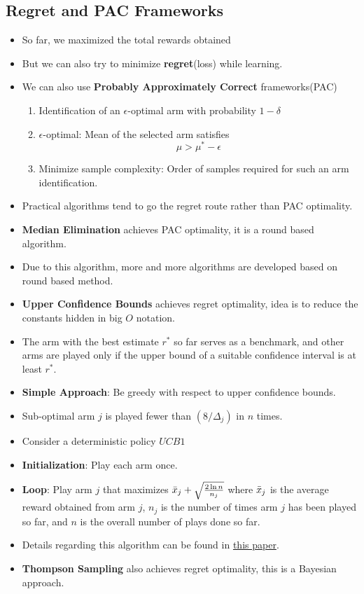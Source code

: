 \documentclass[a4paper]{article}
\begin{document}
\subsection{Regret and PAC Frameworks}
\begin{itemize}
    \item So far, we maximized the total rewards obtained
    \item But we can also try to minimize \textbf{regret}(loss) while learning.
    \item We can also use \textbf{Probably Approximately Correct} frameworks(PAC)
    \begin{enumerate}
        \item Identification of an $\epsilon$-optimal arm with probability $1-\delta$
        \item $\epsilon$-optimal: Mean of the selected arm satisfies
        \begin{equation*}
            \mu>\mu^*-\epsilon
        \end{equation*}
        \item Minimize sample complexity: Order of samples required for such an arm identification.
    \end{enumerate}
    \item Practical algorithms tend to go the regret route rather than PAC optimality.
    \item \textbf{Median Elimination} achieves PAC optimality, it is a round based algorithm.
    \item Due to this algorithm, more and more algorithms are developed based on round based method.
    \item \textbf{Upper Confidence Bounds} achieves regret optimality, idea is to reduce the constants hidden in big $O$ notation.
    \item The arm with the best estimate $r^*$ so far serves as a benchmark, and other arms are played only if the upper bound of a suitable confidence interval is at least $r^*$.
    \item \textbf{Simple Approach}: Be greedy with respect to upper confidence bounds.
    \item Sub-optimal arm $j$ is played fewer than $(8/\Delta_j)$ in $n$ times.
    \item Consider a deterministic policy $UCB1$
    \item \textbf{Initialization}: Play each arm once.
    \item \textbf{Loop}: Play arm $j$ that maximizes $\Bar{x}_j+\sqrt{\frac{2\ln{n}}{n_j}}$ where $\Bar{x}_j$ is the average reward obtained from arm $j$, $n_j$ is the number of times arm $j$ has been played so far, and $n$ is the overall number of plays done so far.
    \item Details regarding this algorithm can be found in \href{https://homes.di.unimi.it/~cesabian/Pubblicazioni/ml-02.pdf}{this paper}.
    \item \textbf{Thompson Sampling} also achieves regret optimality, this is a Bayesian approach.
\end{itemize}
\end{document}
